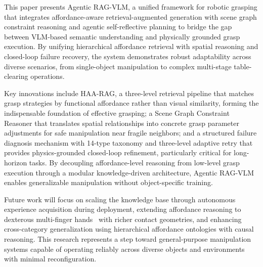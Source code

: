 \documentclass[letterpaper, 10pt, conference]{ieeeconf}
\newcommand{\sysname}{Agentic RAG-VLM}
\newcommand{\haarag}{HAA-RAG}
\begin{document}
This paper presents \sysname{}, a unified framework for robotic grasping that integrates affordance-aware retrieval-augmented generation with scene graph constraint reasoning and agentic self-reflective planning to bridge the gap between VLM-based semantic understanding and physically grounded grasp execution.
By unifying hierarchical affordance retrieval with spatial reasoning and closed-loop failure recovery, the system demonstrates robust adaptability across diverse scenarios, from single-object manipulation to complex multi-stage table-clearing operations.

Key innovations include \haarag{}, a three-level retrieval pipeline that matches grasp strategies by functional affordance rather than visual similarity, forming the indispensable foundation of effective grasping; a Scene Graph Constraint Reasoner that translates spatial relationships into concrete grasp parameter adjustments for safe manipulation near fragile neighbors; and a structured failure diagnosis mechanism with 14-type taxonomy and three-level adaptive retry that provides physics-grounded closed-loop refinement, particularly critical for long-horizon tasks.
By decoupling affordance-level reasoning from low-level grasp execution through a modular knowledge-driven architecture, \sysname{} enables generalizable manipulation without object-specific training.

Future work will focus on scaling the knowledge base through autonomous experience acquisition during deployment, extending affordance reasoning to dexterous multi-finger hands~\cite{liu2025robodexvlm} with richer contact geometries, and enhancing cross-category generalization using hierarchical affordance ontologies with causal reasoning.
This research represents a step toward general-purpose manipulation systems capable of operating reliably across diverse objects and environments with minimal reconfiguration.



\end{document}
